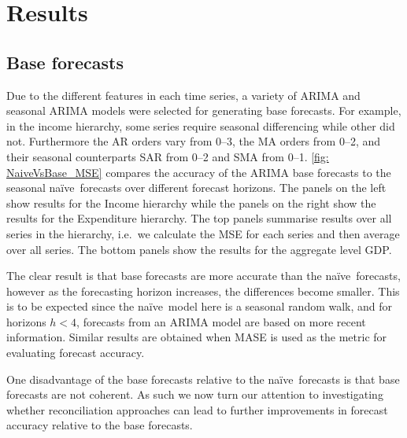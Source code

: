 \documentclass[graybox]{svmult}
\def\naive{na\"{i}ve\ }
\begin{document}
\section{Results}\label{sec:results}

\subsection{Base forecasts}

Due to the different features in each time series, a variety of ARIMA and seasonal ARIMA models were selected for generating base forecasts. For example, in the income hierarchy, some series require seasonal differencing while other did not. Furthermore the AR orders vary from 0--3, the MA orders from 0--2, and their seasonal counterparts SAR from 0--2 and SMA from 0--1. \autoref{fig: NaiveVsBase_MSE} compares the accuracy of the ARIMA base forecasts to the seasonal \naive forecasts over different forecast horizons. The panels on the left show results for the Income hierarchy while the panels on the right show the results for the Expenditure hierarchy. The top panels summarise results over all series in the hierarchy, i.e.\ we calculate the MSE for each series and then average over all series. The bottom panels show the results for the aggregate level GDP.

The clear result is that base forecasts are more accurate than the \naive forecasts, however as the forecasting horizon increases, the differences become smaller. This is to be expected since the \naive model here is a seasonal random walk, and for horizons $h<4$, forecasts from an ARIMA model are based on more recent information. Similar results are obtained when MASE is used as the metric for evaluating forecast accuracy.

One disadvantage of the base forecasts relative to the \naive forecasts is that base forecasts are not coherent. As such we now turn our attention to investigating whether reconciliation approaches can lead to further improvements in forecast accuracy relative to the base forecasts.
\end{document}
